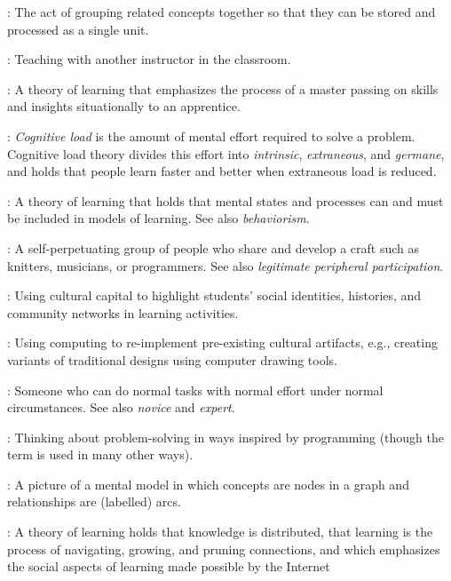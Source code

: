 \begin{description}
: The act of grouping related concepts together so
that they can be stored and processed as a single unit.

: Teaching with another instructor in the
classroom.

: A theory of
learning that emphasizes the process of a master passing on skills and insights
situationally to an apprentice.

: \emph{Cognitive load} is
the amount of mental effort required to solve a problem.  Cognitive load theory
divides this effort into \emph{intrinsic}, \emph{extraneous}, and
\emph{germane}, and holds that people learn faster and better when extraneous
load is reduced.

: A theory of learning that holds that mental
states and processes can and must be included in models of learning. See also
\emph{behaviorism}.

: A self-perpetuating
group of people who share and develop a craft such as knitters, musicians, or
programmers. See also \emph{legitimate peripheral participation}.

: Using cultural
capital to highlight students' social identities, histories, and community
networks in learning activities.

: Using computing
to re-implement pre-existing cultural artifacts, e.g., creating variants of
traditional designs using computer drawing tools.

: Someone who can do
normal tasks with normal effort under normal circumstances.  See also
\emph{novice} and \emph{expert}.

: Thinking about
problem-solving in ways inspired by programming (though the term is used in many
other ways).

: A picture of a mental model in which
concepts are nodes in a graph and relationships are (labelled) arcs.

: A theory of learning holds that knowledge
is distributed, that learning is the process of navigating, growing, and pruning
connections, and which emphasizes the social aspects of learning made possible
by the Internet


\end{description}

